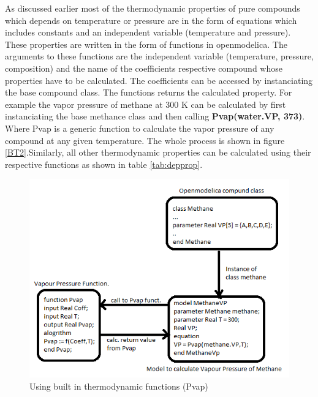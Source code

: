 \documentclass[12pt]{report}
\begin{document}
As discussed earlier most of the thermodynamic properties of pure compounds which depends on temperature or pressure are in the form of equations which includes constants and an independent variable (temperature and pressure). These properties are written in the form of functions in openmodelica. The arguments to these functions are the independent variable (temperature, pressure, composition) and the name of the coefficients respective compound whose properties have to be calculated. The coefficients can be accessed by instanciating the base compound class. The functions returns the calculated property. For example the vapor pressure of methane at 300 K can be calculated by first instanciating the base methance class and then calling \textbf{Pvap(water.VP, 373)}. Where Pvap is a generic function to calculate the vapor pressure of any compound at any given temperature. The whole process is shown in figure \ref{BT2}.Similarly, all other thermodynamic properties can be calculated using their respective functions as shown in table \ref{tab:depprop}.

\begin{figure}
\centering
\includegraphics[width=0.8\linewidth]{BT2}
\caption{Using built in thermodynamic functions (Pvap)}
\end{figure}
\end{document}
